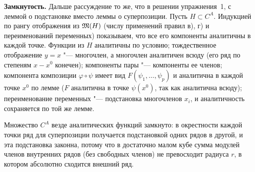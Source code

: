 \begin{solution}[2 (\S\,5)]
\textbf{Замкнутость.} Дальше рассуждение то же, что в решении упражнения~1,
с леммой о подстановке вместо леммы о суперпозиции. Пусть $H\subset C^A$.
Индукцией по рангу отображения из $\mathfrak M(H)$ (числу применений правил в), г)
и переименований переменных) показываем, что все его компоненты аналитичны
в каждой точке. Функции из $H$ аналитичны по условию; тождественное
отображение $y=x$ "--- многочлен, а многочлен аналитичен всюду (его ряд по
степеням $x-x^0$ конечен); компоненты пары "--- компоненты ее членов;
компонента композиции $\varphi\circ\psi$ имеет вид $F(\psi_1,\dots,\psi_p)$
и аналитична в каждой точке $x^0$ по лемме ($F$ аналитична в точке
$\psi(x^0)$, так как аналитична всюду); переименование переменных "---
подстановка многочленов $x_i$, и аналитичность сохраняется по той же лемме.

\answer Множество $C^A$ везде аналитических функций замкнуто: в окрестности
каждой точки ряд для суперпозиции получается подстановкой одних рядов
в другой, и эта подстановка законна, потому что в достаточно малом кубе
сумма модулей членов внутренних рядов (без свободных членов) не превосходит
радиуса $r$, в котором абсолютно сходится внешний ряд.
\end{solution}

